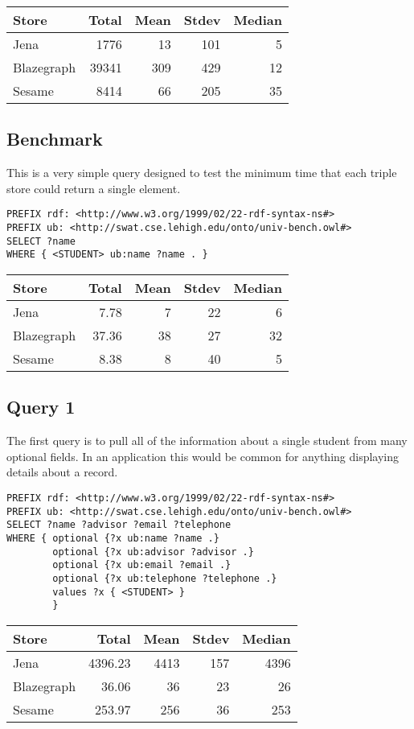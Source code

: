 \documentclass{llncs}
\begin{document}
\begin{tabular}{l | r r r r } Store & Total & Mean & Stdev & Median \\ \hline Jena & 1776 & 13 & 101 & 5 \\ Blazegraph & 39341 & 309 & 429 & 12 \\ Sesame & 8414 & 66 & 205 & 35 \end{tabular}

\subsection{Benchmark}

This is a very simple query designed to test the minimum time that each triple store could return a single element.

\begin{lstlisting}
PREFIX rdf: <http://www.w3.org/1999/02/22-rdf-syntax-ns#>
PREFIX ub: <http://swat.cse.lehigh.edu/onto/univ-bench.owl#>
SELECT ?name
WHERE { <STUDENT> ub:name ?name . }
\end{lstlisting}

\begin{tabular}{l | r r r r } Store & Total & Mean & Stdev & Median \\ \hline Jena & 7.78 & 7 & 22 & 6 \\ Blazegraph & 37.36 & 38 & 27 & 32 \\ Sesame & 8.38 & 8 & 40 & 5 \end{tabular}

\subsection{Query 1}

The first query is to pull all of the information about a single student from many optional fields.  In an application this would be common for anything displaying details about a record.

\begin{lstlisting}
PREFIX rdf: <http://www.w3.org/1999/02/22-rdf-syntax-ns#>
PREFIX ub: <http://swat.cse.lehigh.edu/onto/univ-bench.owl#>
SELECT ?name ?advisor ?email ?telephone
WHERE { optional {?x ub:name ?name .}
        optional {?x ub:advisor ?advisor .}
        optional {?x ub:email ?email .}
        optional {?x ub:telephone ?telephone .}
        values ?x { <STUDENT> }
        }
\end{lstlisting}

\begin{tabular}{l | r r r r } Store & Total & Mean & Stdev & Median \\ \hline Jena & 4396.23 & 4413 & 157 & 4396 \\ Blazegraph & 36.06 & 36 & 23 & 26 \\ Sesame & 253.97 & 256 & 36 & 253 \end{tabular}
\end{document}
